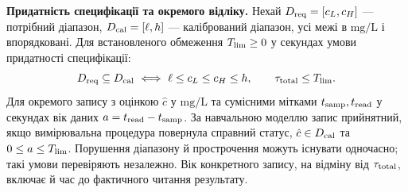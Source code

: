 \documentclass[11pt,a4paper]{article}
\begin{document}
\textbf{Придатність специфікації та окремого відліку.}
Нехай \(D_{\rm req}=[c_L,c_H]\) --- потрібний діапазон,
\(D_{\rm cal}=[\ell,h]\) --- калібрований діапазон,
усі межі в \(\mathrm{mg/L}\) і впорядковані.
Для встановленого обмеження \(T_{\rm lim}\ge0\) у секундах
умови придатності специфікації:
\[
   D_{\rm req}\subseteq D_{\rm cal}
   \ \Longleftrightarrow\ 
   \ell\le c_L\le c_H\le h,
   \qquad
   \tau_{\rm total}\le T_{\rm lim}.
\]
Для окремого запису з оцінкою \(\hat c\) у \(\mathrm{mg/L}\)
та сумісними мітками \(t_{\rm samp},t_{\rm read}\) у секундах
вік даних \(a=t_{\rm read}-t_{\rm samp}\).
За навчальною моделлю запис прийнятний, якщо вимірювальна
процедура повернула справний статус, \(\hat c\in D_{\rm cal}\)
та \(0\le a\le T_{\rm lim}\).
Порушення діапазону й прострочення можуть існувати одночасно;
такі умови перевіряють незалежно. Вік конкретного запису,
на відміну від \(\tau_{\rm total}\), включає й час до фактичного
читання результату.
\end{document}
